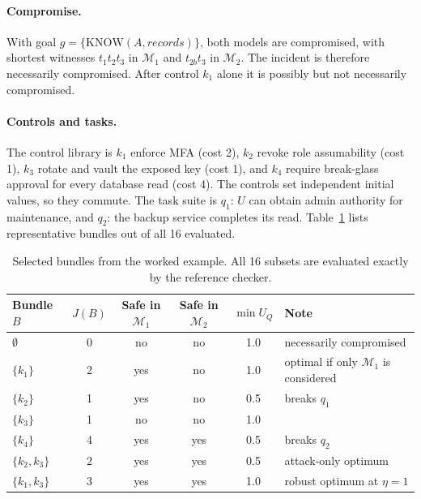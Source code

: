\documentclass[11pt,letterpaper]{article}
\theoremstyle{definition}
\newcommand{\Mod}{\mathcal{M}}
\begin{document}
\paragraph{Compromise.} With goal $g=\{\mathrm{KNOW}(A,\mathit{records})\}$, both models are compromised, with shortest witnesses $t_1t_2t_3$ in $\Mod_1$ and $t_{2b}t_3$ in $\Mod_2$. The incident is therefore necessarily compromised. After control $k_1$ alone it is possibly but not necessarily compromised.

\paragraph{Controls and tasks.} The control library is $k_1$ enforce MFA (cost 2), $k_2$ revoke role assumability (cost 1), $k_3$ rotate and vault the exposed key (cost 1), and $k_4$ require break-glass approval for every database read (cost 4). The controls set independent initial values, so they commute. The task suite is $q_1$: $U$ can obtain admin authority for maintenance, and $q_2$: the backup service completes its read. Table~\ref{tab:example} lists representative bundles out of all 16 evaluated.

\begin{table}[t]
\centering\small
\caption{Selected bundles from the worked example. All 16 subsets are evaluated exactly by the reference checker.}\label{tab:example}
\begin{tabular}{@{}lccccl@{}}
\toprule
Bundle $B$ & $J(B)$ & Safe in $\Mod_1$ & Safe in $\Mod_2$ & $\min U_Q$ & Note \\
\midrule
$\emptyset$ & 0 & no & no & 1.0 & necessarily compromised \\
$\{k_1\}$ & 2 & yes & no & 1.0 & optimal if only $\Mod_1$ is considered \\
$\{k_2\}$ & 1 & yes & no & 0.5 & breaks $q_1$ \\
$\{k_3\}$ & 1 & no & no & 1.0 & \\
$\{k_4\}$ & 4 & yes & yes & 0.5 & breaks $q_2$ \\
$\{k_2,k_3\}$ & 2 & yes & yes & 0.5 & attack-only optimum \\
$\{k_1,k_3\}$ & 3 & yes & yes & 1.0 & robust optimum at $\eta=1$ \\
\bottomrule
\end{tabular}
\end{table}
\end{document}
